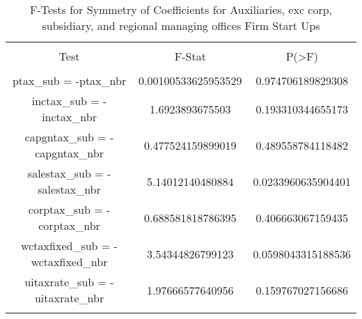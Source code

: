
\begin{table}[!htbp] \centering 
  \caption{F-Tests for Symmetry of Coefficients for Auxiliaries, exc corp, subsidiary, and regional managing offices Firm Start Ups} 
  \label{} 
\begin{tabular}{@{\extracolsep{5pt}} ccc} 
\\[-1.8ex]\hline 
\hline \\[-1.8ex] 
Test & F-Stat & P(\textgreater F) \\ 
\hline \\[-1.8ex] 
ptax\_sub = -ptax\_nbr & 0.00100533625953529 & 0.974706189829308 \\ 
inctax\_sub = -inctax\_nbr & 1.6923893675503 & 0.193310344655173 \\ 
capgntax\_sub = -capgntax\_nbr & 0.477524159899019 & 0.489558784118482 \\ 
salestax\_sub = -salestax\_nbr & 5.14012140480884 & 0.0233960635904401 \\ 
corptax\_sub = -corptax\_nbr & 0.688581818786395 & 0.406663067159435 \\ 
wctaxfixed\_sub = -wctaxfixed\_nbr & 3.54344826799123 & 0.0598043315188536 \\ 
uitaxrate\_sub = -uitaxrate\_nbr & 1.97666577640956 & 0.159767027156686 \\ 
\hline \\[-1.8ex] 
\end{tabular} 
\end{table} 
